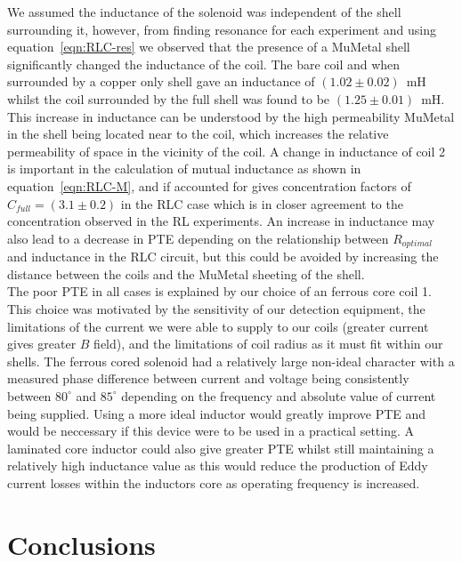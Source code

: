 \documentclass[11pt]{iopart}
\begin{document}
We assumed the inductance of the solenoid was independent of the shell
surrounding it, however, from finding resonance for each experiment
and using equation~\ref{eqn:RLC-res} we observed that the presence of
a MuMetal shell significantly changed the inductance of the coil. The
bare coil and when surrounded by a copper only shell gave an
inductance of $(1.02\pm0.02)$~mH whilst the coil surrounded by the
full shell was found to be $(1.25\pm0.01)$~mH.  This increase in
inductance can be understood by the high permeability MuMetal in the
shell being located near to the coil, which increases the relative
permeability of space in the vicinity of the coil. A change in
inductance of coil 2 is important in the calculation of mutual
inductance as shown in equation~\ref{eqn:RLC-M}, and if accounted for
gives concentration factors of $C_{full}=(3.1\pm0.2)$ in the RLC case
which is in closer agreement to the concentration observed in the RL
experiments. An increase in inductance may also lead to a decrease in
PTE depending on the relationship between $R_{optimal}$ and inductance
in the RLC circuit, but this could be avoided by increasing the
distance between the coils and the MuMetal sheeting of the shell.\\

The poor PTE in all cases is explained by our choice of an ferrous
core coil 1. This choice was motivated by the sensitivity of our
detection equipment, the limitations of the current we were able to
supply to our coils (greater current gives greater $B$ field), and the
limitations of coil radius as it must fit within our shells. The
ferrous cored solenoid had a relatively large non-ideal character with
a measured phase difference between current and voltage being
consistently between $80^\circ$ and $85^\circ$ depending on the
frequency and absolute value of current being supplied. Using a more
ideal inductor would greatly improve PTE and would be neccessary if
this device were to be used in a practical setting. A laminated core
inductor could also give greater PTE whilst still maintaining a
relatively high inductance value as this would reduce the production
of Eddy current losses within the inductors core as operating
frequency is increased. \\

\section{Conclusions}
\end{document}
